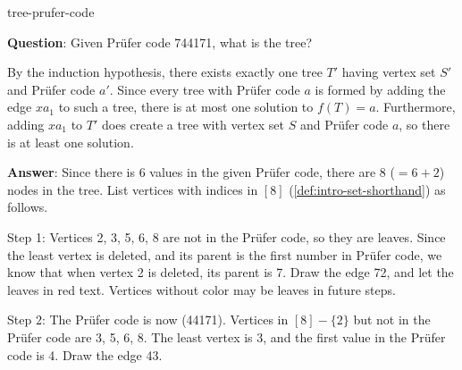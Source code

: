 \documentclass[../src/handouts/main.tex]{subfiles}
\begin{document}
\begin{example}[breakable]{}{tree-prufer-code}
  \def\nd{1cm}%

  \textbf{Question}: Given Prüfer code 744171, what is the tree?

  By the induction hypothesis, there exists exactly one tree $T'$ having vertex set $S'$ and Prüfer code $a'$. Since every tree with Prüfer code $a$ is formed by adding the edge $x a_1$ to such a tree, there is at most one solution to $f(T) = a$. Furthermore, adding $x a_1$ to $T'$ does create a tree with vertex set $S$ and Prüfer code $a$, so there is at least one solution.

  \textbf{Answer}: Since there is 6 values in the given Prüfer code, there are 8 ($ = 6 + 2$) nodes in the tree. List vertices with indices in $[8]$ (\cref{def:intro-set-shorthand}) as follows.

  \begin{center}
  \end{center}

  Step 1: Vertices 2, 3, 5, 6, 8 are not in the Prüfer code, so they are leaves. Since the least vertex is deleted, and its parent is the first number in Prüfer code, we know that when vertex 2 is deleted, its parent is 7. Draw the edge 72, and let the leaves in red text. Vertices without color may be leaves in future steps.

  \begin{center}
  \end{center}

  Step 2: The Prüfer code is now (44171). Vertices in $[8] - \{2\}$ but not in the Prüfer code are 3, 5, 6, 8. The least vertex is 3, and the first value in the Prüfer code is 4. Draw the edge 43.

  \begin{center}
  \end{center}


\end{example}
\end{document}
